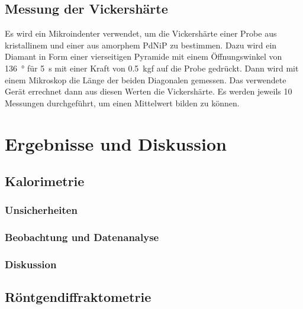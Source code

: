 \documentclass[
	a4paper,
	12pt,
	pagesize,
	ngerman
]{scrartcl}
\begin{document}
	\subsection{Messung der Vickershärte}
 	Es wird ein Mikroindenter verwendet, um die Vickershärte einer Probe aus kristallinem und einer aus amorphem PdNiP zu bestimmen. %
	Dazu wird ein Diamant in Form einer vierseitigen Pyramide mit einem Öffnungswinkel von \SI{136}{\degree} für \SI{5}{s} mit einer Kraft von \SI{0.5}{kgf} auf die Probe gedrückt.
	Dann wird mit einem Mikroskop die Länge der beiden Diagonalen gemessen.
	Das verwendete Gerät errechnet dann aus diesen Werten die Vickershärte.
	Es werden jeweils \num{10} Messungen durchgeführt, um einen Mittelwert bilden zu können.

	\section{Ergebnisse und Diskussion}

	\subsection{Kalorimetrie}
	\subsubsection{Unsicherheiten}
	\subsubsection{Beobachtung und Datenanalyse}
	\subsubsection{Diskussion}

	\subsection{Röntgendiffraktometrie}
\end{document}
